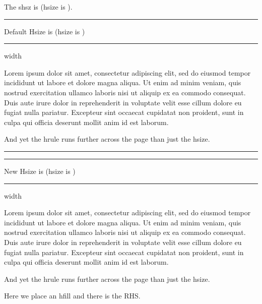 
%

%
\hsize=115mm
\def\shsz{(hsize is \the\hsize)}
\def\localsection#1{\medskip\hrule\medskip#1\shsz\medskip\hrule width \hsize\medskip\par}

The shsz is \shsz .

%
\localsection{Default Hsize is \the\hsize} 
Lorem ipsum dolor sit amet, consectetur adipiscing elit, sed do eiusmod tempor incididunt ut labore et dolore magna aliqua. Ut enim ad minim veniam, quis nostrud exercitation ullamco laboris nisi ut aliquip ex ea commodo consequat. Duis aute irure dolor in reprehenderit in voluptate velit esse cillum dolore eu fugiat nulla pariatur. Excepteur sint occaecat cupidatat non proident, sunt in culpa qui officia deserunt mollit anim id est laborum.

And yet the hrule runs further across the page than just the hsize.
\hrule
\par
\hsize=100mm
\localsection{New Hsize is \the\hsize} 
Lorem ipsum dolor sit amet, consectetur adipiscing elit, sed do eiusmod tempor incididunt ut labore et dolore magna aliqua. Ut enim ad minim veniam, quis nostrud exercitation ullamco laboris nisi ut aliquip ex ea commodo consequat. Duis aute irure dolor in reprehenderit in voluptate velit esse cillum dolore eu fugiat nulla pariatur. Excepteur sint occaecat cupidatat non proident, sunt in culpa qui officia deserunt mollit anim id est laborum.

And yet the hrule runs further across the page than just the hsize.

Here we place an hfill \hfill and there is the RHS.

